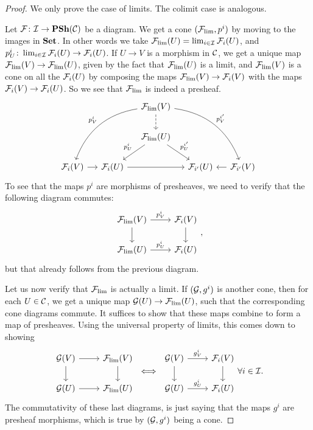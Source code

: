 \documentclass{article}
\begin{document}
\begin{proof}
    We only prove the case of limits. The colimit case is
    analogous.

    Let $\mathcal{F} \colon \mathcal{I} \to \operatorname{\mathbf{PSh}}(\mathcal{C})$ be a diagram.
    We get a cone $(\mathcal{F}_{\lim}, p^i)$ by
    moving to the images in $\operatorname{\mathbf{Set}}$. In other words we take
    $\mathcal{F}_{\lim} (U) = \lim_{i \in \mathcal{I}} \mathcal{F}_i(U)$,
    and $p^i_U \colon \lim_{i\in \mathcal{I}}\mathcal{F}_i(U) \to \mathcal{F}_i(U)$.
    If $U\to V$ is a morphism in $\mathcal{C}$, we get a unique map
    $\mathcal{F}_{\lim}(V) \to \mathcal{F}_{\lim}(U)$, given by the fact
    that $\mathcal{F}_{\lim}(U)$ is a limit, and $\mathcal{F}_{\lim}(V)$ is a cone
    on all the $\mathcal{F}_i(U)$ by composing the maps $\mathcal{F}_{\lim}(V) \to \mathcal{F}_i(V)$ with
    the maps $\mathcal{F}_i(V) \to \mathcal{F}_i(U)$. So we see that $\mathcal{F}_{\lim}$
    is indeed a presheaf.
    \begin{equation*}
        \begin{tikzcd}[column sep=small]
            &&\mcF_{\lim}(V) \dar[dashed] \ar[ddll, bend right, "p^i_V"'] \ar[ddrr, bend left, "p^{i'}_V"]\\
            &&\mcF_{\lim}(U) \ar[dl, "p^i_U"'] \ar[dr, "p^{i'}_U"]\\
            \mcF_i(V) \rar &\mcF_i(U) \ar[rr] &&\mcF_{i'}(U) &\mcF_{i'}(V) \lar
        \end{tikzcd}
    \end{equation*}
    To see that the maps $p^i$ are morphisms of presheaves, we need
    to verify that the following diagram commutes:
    \begin{equation*}
        \begin{tikzcd}
            \mcF_{\lim}(V) \dar \rar["p^i_V"] & \mcF_i(V) \dar \\
            \mcF_{\lim}(U) \rar["p^i_U"] & \mcF_i(U)
        \end{tikzcd},
    \end{equation*}
    but that already follows from the previous diagram.

    Let us now verify that $\mathcal{F}_{\lim}$ is actually a limit.
    If $(\mathcal{G}, g^i)$ is another cone, then for each $U\in \mathcal{C}$,
    we get a unique map $\mathcal{G}(U) \to \mathcal{F}_{\lim}(U)$, such that the
    corresponding cone diagrams commute. It suffices to show that these
    maps combine to form a map of presheaves.
    Using the universal property of limits, this comes down to showing
    \begin{equation*}
        \begin{tikzcd}
            \mcG(V)\rar \dar & \mcF_{\lim}(V) \dar \\
            \mcG(U)\rar & \mcF_{\lim}(U)
        \end{tikzcd}
        \iff
        \begin{tikzcd}
            \mcG(V)\rar["g^i_V"] \dar & \mcF_{i}(V) \dar \\
            \mcG(U)\rar["g^i_U"] & \mcF_{i}(U)
        \end{tikzcd}
        \forall i\in \mcI.
    \end{equation*}
    The commutativity of these last diagrams, is just saying that the
    maps $g^i$ are presheaf morphisms, which is true by $(\mathcal{G}, g^i)$ being a cone.
\end{proof}
\end{document}
